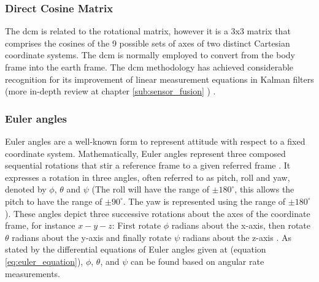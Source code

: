 \subsubsection{Direct Cosine Matrix}

The \acrfull{dcm} is related to the rotational matrix, however it is a 3x3 matrix that comprises the cosines of the 9 possible sets of axes of two distinct Cartesian coordinate systems. The \acrshort{dcm} is normally employed to convert from the body frame into the earth frame. The \acrshort{dcm} methodology has achieved considerable recognition for its improvement of linear measurement equations in Kalman filters (more in-depth review at chapter \ref{sub:sensor_fusion} ) \cite{premerlani2009direction}.

\subsubsection{Euler angles}

Euler angles are a well-known form to represent attitude with respect to a fixed coordinate system. Mathematically, Euler angles represent three composed sequential rotations that stir a reference frame to a given referred frame \cite{diebel2006representing}. It expresses a rotation in three angles, often referred to as pitch, roll and yaw, denoted by $\phi$, $\theta$ and $\psi$ (The roll will have the range of $\pm180^\circ$, this allows the pitch to have the range of $\pm90^{\circ}$. The yaw is represented using the range of $\pm180^{\circ}$). These angles depict three successive rotations about the axes of the coordinate frame, for instance $x-y-z$: First rotate $\phi$ radians about the x-axis, then rotate $\theta$ radians about the y-axis and finally rotate $\psi$ radians about the z-axis \cite{grado1960solution}. As stated by the differential equations of Euler angles given at (equation \ref{eq:euler_equation}), $\phi$, $\theta$, and $\psi$ can be found based on angular rate measurements.


